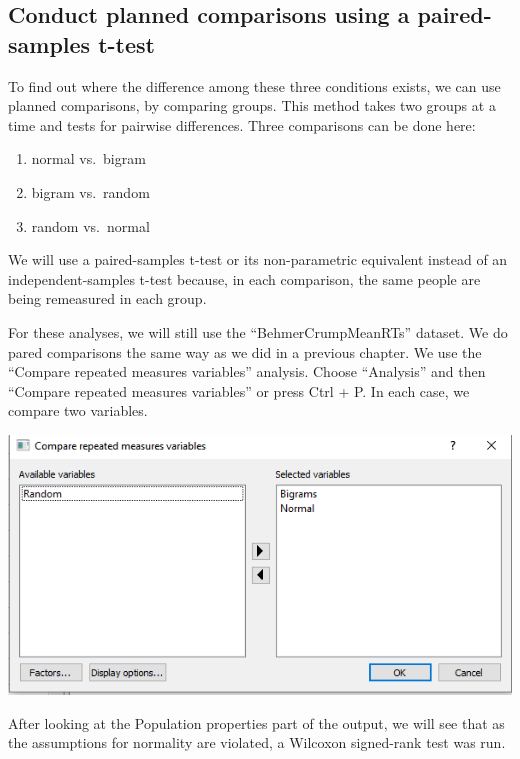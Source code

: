 \documentclass[
]{book}
\begin{document}
\hypertarget{conduct-planned-comparisons-using-a-paired-samples-t-test-1}{%
\subsection{Conduct planned comparisons using a paired-samples t-test}\label{conduct-planned-comparisons-using-a-paired-samples-t-test-1}}

To find out where the difference among these three conditions exists, we can use planned comparisons, by comparing groups. This method takes two groups at a time and tests for pairwise differences. Three comparisons can be done here:

\begin{enumerate}
\def\labelenumi{\arabic{enumi}.}
\item
  normal vs.~bigram
\item
  bigram vs.~random
\item
  random vs.~normal
\end{enumerate}

We will use a paired-samples t-test or its non-parametric equivalent instead of an independent-samples t-test because, in each comparison, the same people are being remeasured in each group.

For these analyses, we will still use the ``BehmerCrumpMeanRTs'' dataset. We do pared comparisons the same way as we did in a previous chapter. We use the ``Compare repeated measures variables'' analysis. Choose ``Analysis'' and then ``Compare repeated measures variables'' or press Ctrl + P. In each case, we compare two variables.

\includegraphics{img/ch9/9.5CRMVAG_window.png}

After looking at the Population properties part of the output, we will see that as the assumptions for normality are violated, a Wilcoxon signed-rank test was run.
\end{document}
